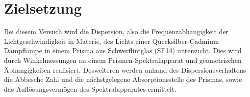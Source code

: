 \section{Zielsetzung}
\label{sec:Zielsetzung}
Bei diesem Versuch wird die Dispersion, also die Frequenzabhängigkeit der Lichtgeschwindigkeit in Materie, des Lichts einer
Quecksilber-Cadmium Dampflampe in einem Prisma aus Schwerflintglas (SF14) untersucht. Dies wird durch Winkelmessungen
an einem Prismen-Spektralapparat und geometrischen Äbhangigkeiten realisiert.
Desweiteren werden anhand des Dispersionsverhaltens die Abbesche Zahl und die nächstgelegene Absorptionsstelle des Prismas, sowie das Auflösungsvermögen des
Spektralapparates ermittelt.

